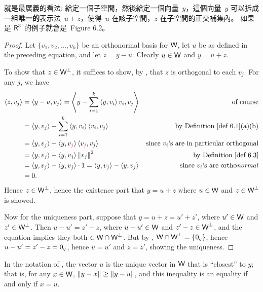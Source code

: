\begin{note}
 就是最廣義的看法:
給定一個子空間，然後給定一個向量\ \(y\)，這個向量\ \(y\) 可以拆成一組\textbf{唯一的}表示法\ \(u + z\)，使得\ \(u\) 在該子空間，\(z\) 在子空間的正交補集內。
如果是 \(\textsf{R}^3\) 的例子就會是\ Figure 6.2。
\end{note}

\begin{proof}
Let \(\{ v_1, v_2, ..., v_k \}\) be an orthonormal basis for \(\textsf{W}\), let \(u\) be as defined in the preceding equation, and let \(z = y - u\). Clearly \(u \in \textsf{W}\) and \(y = u + z\).

To show that \(z \in \textsf{W}^{\perp}\), it suffices to show, by , that \(z\) is orthogonal to each \(v_j\).
For any \(j\), we have
\begin{align*}
    \LG z, v_j \RG & = \LG y - u, v_j \RG = \LG y - \sum_{i = 1}^k \LG y, v_i \RG v_i, v_j \RG & \text{of course} \\
        & = \LG y, v_j \RG - \sum_{i = 1}^k \LG y, v_i \RG \LG v_i, v_j \RG & \text{by \DEF{6.1}(a)(b)} \\
        & = \LG y, v_j \RG - \LG y, v_{\RED{j}} \RG \LG v_{\RED{j}}, v_j \RG & \text{since \(v_i\)'s are in particular orthogonal} \\
        & = \LG y, v_j \RG - \LG y, v_{j} \RG \norm{v_j}^2 & \text{by \DEF{6.3}} \\
        & = \LG y, v_j \RG - \LG y, v_{j} \RG \cdot 1 = \LG y, v_j \RG - \LG y, v_{j} \RG & \text{since \(v_i\)'s are ortho\emph{normal}} \\
        & = 0.
\end{align*}
Hence \(z \in \textsf{W}^{\perp}\), hence the existence part that \(y = u + z\) where \(u \in \textsf{W}\) and \(z \in \textsf{W}^{\perp}\) is showed.

Now for the uniqueness part, suppose that \(y = u + z = u' + z'\), where \(u' \in \textsf{W}\) and \(z' \in \textsf{W}^{\perp}\).
Then \(u - u' = z'- z\), where \(u - u' \in \textsf{W}\) and \(z' - z \in \textsf{W}^{\perp}\), and the equation implies they both \(\in \textsf{W} \cap \textsf{W}^{\perp}\).
But by , \(\textsf{W} \cap \textsf{W}^{\perp} = \{ 0_{_{\textsf{V}}} \}\), hence \(u - u' = z' - z = 0_{_{\textsf{V}}}\), hence \(u = u'\) and \(z = z'\), showing the uniqueness.
\end{proof}

\begin{corollary} \label{corollary 6.6.1}
In the notation of , the vector \(u\) is the unique vector in \(\textsf{W}\) that is ``closest'' to \(y\);
that is, for any \(x \in \textsf{W}\), \(\left\lVert y - x\right\rVert \ge \left\lVert y - u\right\rVert\), and this inequality is an equality if and only if \(x = u\).
\end{corollary}

